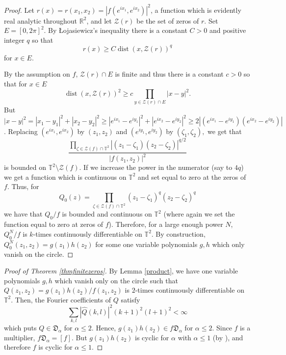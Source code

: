 \documentclass[11 pt,reqno]{amsart}
\theoremstyle{definition}
\theoremstyle{remark}
\numberwithin{equation}{section} \numberwithin{figure}{section}
\begin{document}
\begin{proof}
  Let $r(x) = r(x_1,x_2) = |f(e^{ix_1}, e^{ix_2})|^2$, a function which is
  evidently real analytic throughout ${{\mathbb R}}^2$, and let ${\mathcal{Z}}(r)$ be the set
  of zeros of $r$.  Set $E = [0,2\pi]^2$.  By \L ojasiewicz's
  inequality there is a constant $C>0$ and positive integer $q$ so
  that
\[
r(x) \geq C \operatorname{dist}(x, {\mathcal{Z}}(r))^q
\]
for $x \in E$.

By the assumption on $f$, ${\mathcal{Z}}(r) \cap E$ is finite and thus there is
a constant $c>0$ so that for $x\in E$
\[
\operatorname{dist}(x,{\mathcal{Z}}(r))^2  \geq c \prod_{y \in {\mathcal{Z}}(r) \cap E} |x-y|^2.
\]
But $|x-y|^2 = |x_1-y_1|^2 + |x_2-y_2|^2\geq |e^{ix_1} -
e^{iy_1}|^2+|e^{ix_2} - e^{iy_2}|^2 \geq 2|(e^{ix_1} -
e^{iy_1})(e^{ix_2} - e^{iy_2})|$.  
Replacing $(e^{ix_1},e^{ix_2})$ by $(z_1,z_2)$ and $(e^{iy_1},e^{iy_2})$ by $(\zeta_1,\zeta_2),$ we get that
\[
\frac{\prod_{\zeta \in {\mathcal{Z}}(f)\cap {{\mathbb T}}^2}
  |(z_1-\zeta_1)(z_2-\zeta_2)|^{q/2}}{|f(z_1,z_2)|^2}
\]
is bounded on ${{\mathbb T}}^2\setminus {\mathcal{Z}}(f)$.  If we increase the power in
the numerator (say to $4q$) we get a function which is continuous on
${{\mathbb T}}^2$ and set equal to zero at the zeros of $f$.  Thus, for
\[
Q_0(z) = \prod_{\zeta \in {\mathcal{Z}}(f)\cap {{\mathbb T}}^2}
(z_1-\zeta_1)^q(z_2-\zeta_2)^q
\]
we have that $Q_0/f$ is bounded and continuous on ${{\mathbb T}}^2$ (where again
we set the function equal to zero at zeros of $f$).  Therefore, for a
large enough power $N$, $Q_0^N/f$ is $k$-times continuously
differentiable on ${{\mathbb T}}^2$. By construction, $Q_0^N(z_1,z_2) =
g(z_1)h(z_2)$ for some one variable polynomials $g,h$ which only
vanish on the circle.
\end{proof}

\begin{proof}[Proof of Theorem \ref{thmfinitezeros}]
  By Lemma \ref{product}, we have one variable polynomials $g,h$ which
  vanish only on the circle such that $Q(z_1,z_2) =
  g(z_1)h(z_2)/f(z_1,z_2)$ is $2$-times continuously differentiable on
  ${{\mathbb T}}^2$.  Then, the Fourier coefficients of $Q$ satisfy
\[
\sum_{k,l} |\hat{Q}(k,l)|^2 (k+1)^2 (l+1)^2 <\infty
\]
which puts $Q \in \mathfrak{D}_{\alpha}$ for $\alpha \leq 2$.  Hence,
$g(z_1)h(z_2) \in f \mathfrak{D}_{\alpha}$ for $\alpha \leq 2$. Since $f$ is a multiplier, 
 $f \mathfrak{D}_{\alpha} = [f]$. 
But $g(z_1)h(z_2)$ is cyclic for $\alpha$ with $\alpha \leq 1$ (by \cite{BCLSS13II}), and therefore $f$ is cyclic for
$\alpha \leq 1$. \end{proof}
\end{document}
